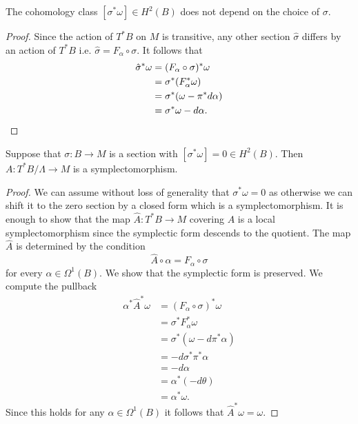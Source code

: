 \begin{prop}
    The cohomology class $[\sigma^*\omega] \in H^2(B)$ does not depend on the choice of $\sigma$.
\end{prop}
\begin{proof}
    Since the action of $T^*B$ on $M$ is transitive, any other section $\hat{\sigma}$ differs by an action of $T^*B$ i.e. $\hat{\sigma} = F_{\alpha} \circ \sigma$. It follows that
    \begin{align*}
        \hat{\sigma}^*\omega & = (F_{\alpha} \circ \sigma)^*\omega  \\
                             & = \sigma^*(F_{\alpha}^* \omega)      \\
                             & = \sigma^*(\omega - \pi^*d\alpha)    \\
                             & = \sigma^*\omega - d\alpha. \qedhere
    \end{align*}
\end{proof}

\begin{lemma}
    Suppose that $\sigma: B \to M$ is a section with $[\sigma^*\omega] = 0 \in H^2(B)$. Then $A: T^*B/\Lambda \to M$ is a symplectomorphism.
\end{lemma}
\begin{proof}
    We can assume without loss of generality that $\sigma^*\omega = 0$ as otherwise we can shift it to the zero section by a closed form which is a symplectomorphism. It is enough to show that the map $\hat{A}: T^*B \to M$ covering $A$ is a local symplectomorphism since the symplectic form descends to the quotient.
    The map $\hat{A}$ is determined by the condition
    $$
        \hat{A}\circ \alpha = F_{\alpha} \circ \sigma
    $$
    for every $\alpha \in \Omega^1(B)$. We show that the symplectic form is preserved. We compute the pullback
    \begin{align*}
        \alpha^*\hat{A}^*\omega & = (F_{\alpha} \circ \sigma)^*\omega \\
                                & = \sigma^*F_{\alpha}^* \omega       \\
                                & = \sigma^*(\omega - d\pi^*\alpha)   \\
                                & = -d\sigma^*\pi^*\alpha             \\
                                & = -d\alpha                          \\
                                & = \alpha^*(-d\theta)                \\
                                & = \alpha^* \omega.
    \end{align*}
    Since this holds for any $\alpha \in \Omega^1(B)$ it follows that $\hat{A}^*\omega = \omega$.
\end{proof}


